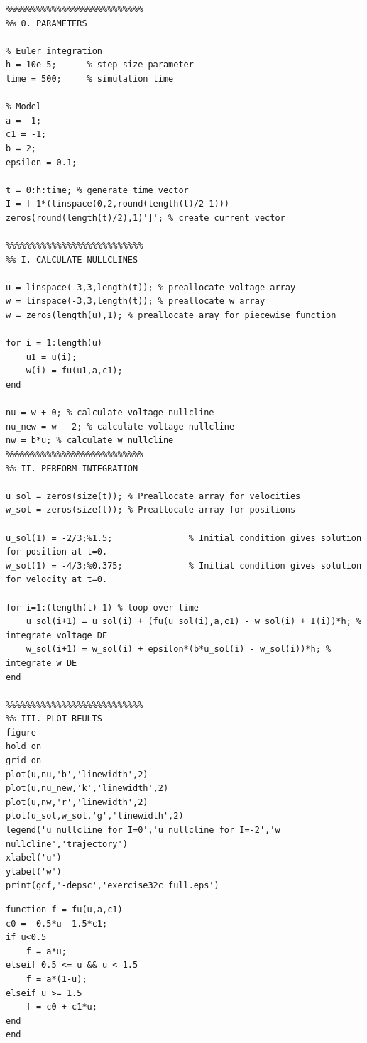 \documentclass[12pt]{article}
\newenvironment{exercise}[2][Exercise]{\begin{trivlist}
\item[\hskip \labelsep {\bfseries #1}\hskip \labelsep {\bfseries #2.}]}{\end{trivlist}}
\begin{document}
\begin{exercise}{3.2}
\begin{enumerate}
\begin{tiny}
\begin{lstlisting}
%%%%%%%%%%%%%%%%%%%%%%%%%%%
%% 0. PARAMETERS

% Euler integration
h = 10e-5;      % step size parameter
time = 500;     % simulation time

% Model
a = -1;
c1 = -1;
b = 2;
epsilon = 0.1;

t = 0:h:time; % generate time vector
I = [-1*(linspace(0,2,round(length(t)/2-1))) zeros(round(length(t)/2),1)']'; % create current vector

%%%%%%%%%%%%%%%%%%%%%%%%%%%
%% I. CALCULATE NULLCLINES

u = linspace(-3,3,length(t)); % preallocate voltage array
w = linspace(-3,3,length(t)); % preallocate w array
w = zeros(length(u),1); % preallocate aray for piecewise function

for i = 1:length(u)
    u1 = u(i);
    w(i) = fu(u1,a,c1);
end

nu = w + 0; % calculate voltage nullcline
nu_new = w - 2; % calculate voltage nullcline
nw = b*u; % calculate w nullcline
%%%%%%%%%%%%%%%%%%%%%%%%%%%
%% II. PERFORM INTEGRATION

u_sol = zeros(size(t)); % Preallocate array for velocities
w_sol = zeros(size(t)); % Preallocate array for positions

u_sol(1) = -2/3;%1.5;               % Initial condition gives solution for position at t=0.
w_sol(1) = -4/3;%0.375;             % Initial condition gives solution for velocity at t=0.

for i=1:(length(t)-1) % loop over time
    u_sol(i+1) = u_sol(i) + (fu(u_sol(i),a,c1) - w_sol(i) + I(i))*h; % integrate voltage DE
    w_sol(i+1) = w_sol(i) + epsilon*(b*u_sol(i) - w_sol(i))*h; % integrate w DE
end

%%%%%%%%%%%%%%%%%%%%%%%%%%%
%% III. PLOT REULTS
figure
hold on
grid on
plot(u,nu,'b','linewidth',2)
plot(u,nu_new,'k','linewidth',2)
plot(u,nw,'r','linewidth',2)
plot(u_sol,w_sol,'g','linewidth',2)
legend('u nullcline for I=0','u nullcline for I=-2','w nullcline','trajectory')
xlabel('u')
ylabel('w')
print(gcf,'-depsc','exercise32c_full.eps')
\end{lstlisting}
\end{tiny}

\begin{tiny}
\begin{lstlisting}
function f = fu(u,a,c1)
c0 = -0.5*u -1.5*c1;
if u<0.5
    f = a*u;
elseif 0.5 <= u && u < 1.5
    f = a*(1-u);
elseif u >= 1.5
    f = c0 + c1*u;
end
end
\end{lstlisting}
\end{tiny}


\end{enumerate}
\end{exercise}
\end{document}
